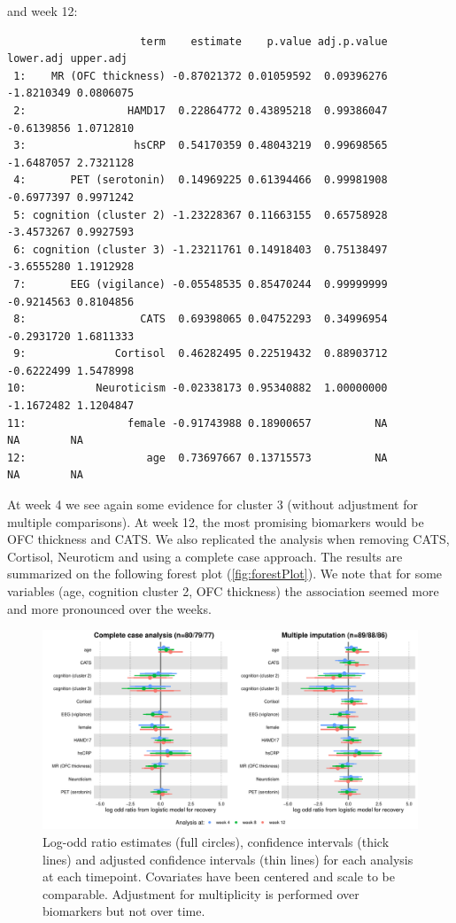 \documentclass[12pt]{article}
\begin{document}
and week 12:
\begin{verbatim}
                     term    estimate    p.value adj.p.value  lower.adj upper.adj
 1:    MR (OFC thickness) -0.87021372 0.01059592  0.09396276 -1.8210349 0.0806075
 2:                HAMD17  0.22864772 0.43895218  0.99386047 -0.6139856 1.0712810
 3:                 hsCRP  0.54170359 0.48043219  0.99698565 -1.6487057 2.7321128
 4:       PET (serotonin)  0.14969225 0.61394466  0.99981908 -0.6977397 0.9971242
 5: cognition (cluster 2) -1.23228367 0.11663155  0.65758928 -3.4573267 0.9927593
 6: cognition (cluster 3) -1.23211761 0.14918403  0.75138497 -3.6555280 1.1912928
 7:       EEG (vigilance) -0.05548535 0.85470244  0.99999999 -0.9214563 0.8104856
 8:                  CATS  0.69398065 0.04752293  0.34996954 -0.2931720 1.6811333
 9:              Cortisol  0.46282495 0.22519432  0.88903712 -0.6222499 1.5478998
10:           Neuroticism -0.02338173 0.95340882  1.00000000 -1.1672482 1.1204847
11:                female -0.91743988 0.18900657          NA         NA        NA
12:                   age  0.73697667 0.13715573          NA         NA        NA
\end{verbatim}

At week 4 we see again some evidence for cluster 3 (without adjustment
for multiple comparisons). At week 12, the most promising biomarkers
would be OFC thickness and CATS. We also replicated the analysis when
removing CATS, Cortisol, Neuroticm and using a complete case
approach. The results are summarized on the following forest plot
(\autoref{fig:forestPlot}). We note that for some variables (age,
cognition cluster 2, OFC thickness) the association seemed more and
more pronounced over the weeks.

\clearpage
\begin{figure}[!h]
\centering
\includegraphics[trim={0 0 0 0},width=\textwidth]{./../figures/gg-forestplot-OR.pdf}
\caption{\label{fig:forestPlot}Log-odd ratio estimates (full circles), confidence intervals (thick lines) and adjusted confidence intervals (thin lines) for each analysis at each timepoint. Covariates have been centered and scale to be comparable. Adjustment for multiplicity is performed over biomarkers but not over time.}
\end{figure}
\end{document}
